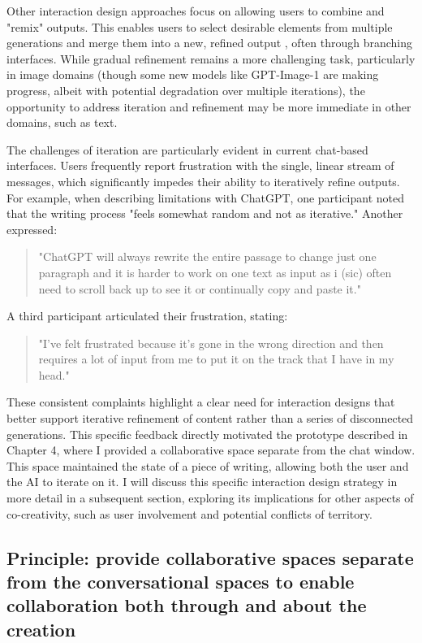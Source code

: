 Other interaction design approaches focus on allowing users to combine and "remix" outputs. This enables users to select desirable elements from multiple generations and merge them into a new, refined output \cite{Zhou2024-vp}, often through branching interfaces. While gradual refinement remains a more challenging task, particularly in image domains (though some new models like GPT-Image-1 are making progress, albeit with potential degradation over multiple iterations), the opportunity to address iteration and refinement may be more immediate in other domains, such as text.

The challenges of iteration are particularly evident in current chat-based interfaces. Users frequently report frustration with the single, linear stream of messages, which significantly impedes their ability to iteratively refine outputs. For example, when describing limitations with ChatGPT, one participant noted that the writing process "feels somewhat random and not as iterative." Another expressed:

\begin{quote}
"ChatGPT will always rewrite the entire passage to change just one paragraph and it is harder to work on one text as input as i (sic) often need to scroll back up to see it or continually copy and paste it."
\end{quote}

A third participant articulated their frustration, stating:

\begin{quote}
"I’ve felt frustrated because it’s gone in the wrong direction and then requires a lot of input from me to put it on the track that I have in my head."
\end{quote}

These consistent complaints highlight a clear need for interaction designs that better support iterative refinement of content rather than a series of disconnected generations. This specific feedback directly motivated the prototype described in Chapter 4, where I provided a collaborative space separate from the chat window. This space maintained the state of a piece of writing, allowing both the user and the AI to iterate on it. I will discuss this specific interaction design strategy in more detail in a subsequent section, exploring its implications for other aspects of co-creativity, such as user involvement and potential conflicts of territory.


\subsection{Principle: provide collaborative spaces separate from the conversational spaces to enable collaboration both through and about the creation}

